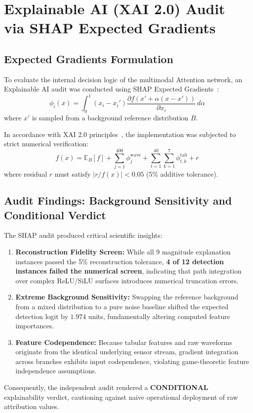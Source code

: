 \documentclass[journal]{IEEEtran}
\begin{document}
\section{Explainable AI (XAI 2.0) Audit via SHAP Expected Gradients}

\subsection{Expected Gradients Formulation}
To evaluate the internal decision logic of the multimodal Attention network, an Explainable AI audit was conducted using SHAP Expected Gradients~\cite{lundberg2017unified}:
\begin{equation}
\phi_i(x) = \int_0^1 (x_i - x_i') \frac{\partial f(x' + \alpha(x - x'))}{\partial x_i} \, d\alpha
\label{eq:expected_gradients}
\end{equation}
where $x'$ is sampled from a background reference distribution $B$.

In accordance with XAI 2.0 principles~\cite{longo2024explainable}, the implementation was subjected to strict numerical verification:
\begin{equation}
f(x) = \mathbb{E}_B[f] + \sum_{j=1}^{400} \phi_j^{\text{wave}} + \sum_{t=1}^{40} \sum_{k=1}^7 \phi_{t, k}^{\text{tab}} + r
\label{eq:shap_reconstruction}
\end{equation}
where residual $r$ must satisfy $|r / f(x)| < 0.05$ (5\% additive tolerance).

\subsection{Audit Findings: Background Sensitivity and Conditional Verdict}
The SHAP audit produced critical scientific insights:
\begin{enumerate}
    \item \textbf{Reconstruction Fidelity Screen:} While all 9 magnitude explanation instances passed the 5\% reconstruction tolerance, \textbf{4 of 12 detection instances failed the numerical screen}, indicating that path integration over complex ReLU/SiLU surfaces introduces numerical truncation errors.
    \item \textbf{Extreme Background Sensitivity:} Swapping the reference background from a mixed distribution to a pure noise baseline shifted the expected detection logit by $1.974$ units, fundamentally altering computed feature importances.
    \item \textbf{Feature Codependence:} Because tabular features and raw waveforms originate from the identical underlying sensor stream, gradient integration across branches exhibits input codependence, violating game-theoretic feature independence assumptions.
\end{enumerate}
Consequently, the independent audit rendered a \textbf{CONDITIONAL} explainability verdict, cautioning against naive operational deployment of raw attribution values.
\end{document}
